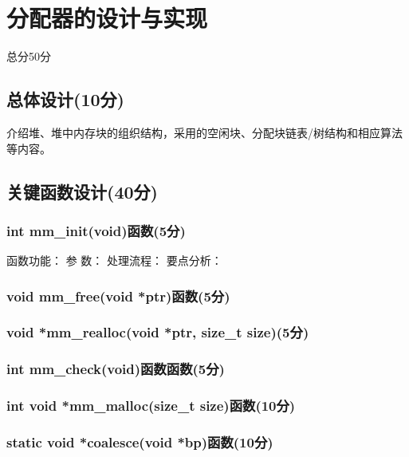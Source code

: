 \section{分配器的设计与实现}
\begin{center}
    总分50分
\end{center}

\subsection{总体设计(10分)}
介绍堆、堆中内存块的组织结构，采用的空闲块、分配块链表/树结构和相应算法等内容。

\subsection{关键函数设计(40分)}
\subsubsection{int mm\_init(void)函数(5分)}

函数功能：
参   数：
处理流程：
要点分析：

\subsubsection{void mm\_free(void *ptr)函数(5分)}
\subsubsection{void *mm\_realloc(void *ptr, size\_t size)(5分)}
\subsubsection{int mm\_check(void)函数函数(5分)}
\subsubsection{int void *mm\_malloc(size\_t size)函数(10分)}
\subsubsection{static void *coalesce(void *bp)函数(10分)}
